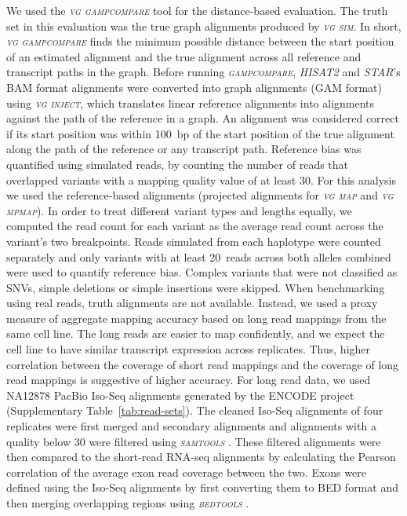 \documentclass[11pt]{ucthesis}
\newcommand{\tool}[1]{\emph{\textsc{#1}}}
\begin{document}
We used the \tool{vg gampcompare} tool for the distance-based evaluation. The truth set in this evaluation was the true graph alignments produced by \tool{vg sim}. In short, \tool{vg gampcompare} finds the minimum possible distance between the start position of an estimated alignment and the true alignment across all reference and transcript paths in the graph. Before running \tool{gampcompare}, \tool{HISAT2} and \tool{STAR}'s BAM format alignments were converted into graph alignments (GAM format) using \tool{vg inject}, which translates linear reference alignments into alignments against the path of the reference in a graph. An alignment was considered correct if its start position was within 100~bp of the start position of the true alignment along the path of the reference or any transcript path.
\newline 
\newline
Reference bias was quantified using simulated reads, by counting the number of reads that overlapped variants with a mapping quality value of at least 30. For this analysis we used the reference-based alignments (projected alignments for \tool{vg map} and \tool{vg mpmap}). In order to treat different variant types and lengths equally, we computed the read count for each variant as the average read count across the variant's two breakpoints. Reads simulated from each haplotype were counted separately and only variants with at least 20~reads across both alleles combined were used to quantify reference bias. Complex variants that were not classified as SNVs, simple deletions or simple insertions were skipped. 
\newline 
\newline
When benchmarking using real reads, truth alignments are not available. Instead, we used a proxy measure of aggregate mapping accuracy based on long read mappings from the same cell line. The long reads are easier to map confidently, and we expect the cell line to have similar transcript expression across replicates. Thus, higher correlation between the coverage of short read mappings and the coverage of long read mappings is suggestive of higher accuracy. For long read data, we used NA12878 PacBio Iso-Seq alignments generated by the ENCODE project (Supplementary Table~\ref{tab:read-sets}). The cleaned Iso-Seq alignments of four replicates were first merged and secondary alignments and alignments with a quality below 30 were filtered using \tool{samtools} \cite{li2009sequence}. These filtered alignments were then compared to the short-read RNA-seq alignments by calculating the Pearson correlation of the average exon read coverage between the two. Exons were defined using the Iso-Seq alignments by first converting them to BED format and then merging overlapping regions using \tool{bedtools} \cite{quinlan2010bedtools}. 
\end{document}
